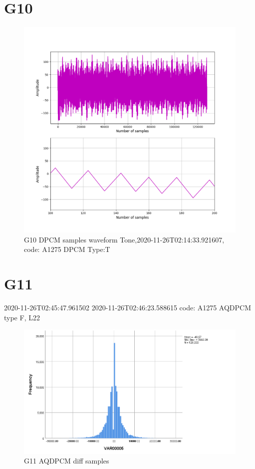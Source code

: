 \documentclass[hidelinks, 12pt, a4paper]{article}
\begin{document}
\section{G10}

\begin{figure}[h!]
\centering
	\includegraphics[height=.38\textheight, width=\textwidth]{assets/session1/g10.png}
    \caption{G10 DPCM samples waveform Tone,2020-11-26T02:14:33.921607, code: A1275 DPCM Type:T}
\end{figure}

\section{G11}
2020-11-26T02:45:47.961502
2020-11-26T02:46:23.588615
code: A1275 AQDPCM type F, L22
\begin{figure}[h!]
\centering
	\includegraphics[height=.38\textheight, width=\textwidth]{assets/session1/g11.png}
    \caption{G11 AQDPCM diff samples}
\end{figure}
\end{document}
